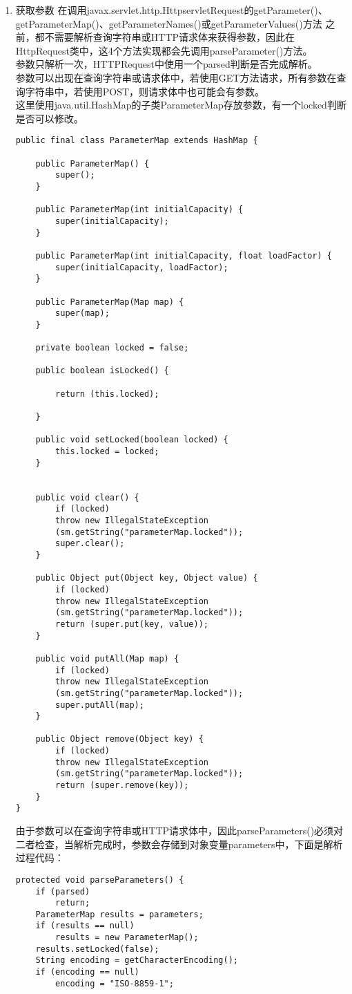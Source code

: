 \begin{enumerate}
\begin{lstlisting}
	return ((Cookie[]) cookies.toArray(new Cookie[cookies.size()]));
	
}
\end{lstlisting}
\item 获取参数
在调用javax.servlet.http.HttpservletRequest的getParameter()、
getParameterMap()、getParameterNames()或getParameterValues()方法
之前，都不需要解析查询字符串或HTTP请求体来获得参数，因此在HttpRequest类中，这4个方法实现都会先调用parseParameter()方法。\\
参数只解析一次，HTTPRequest中使用一个parsed判断是否完成解析。\\
参数可以出现在查询字符串或请求体中，若使用GET方法请求，所有参数在查询字符串中，若使用POST，则请求体中也可能会有参数。\\
这里使用java.util.HashMap的子类ParameterMap存放参数，有一个locked判断是否可以修改。
\begin{lstlisting}
public final class ParameterMap extends HashMap {
	
	public ParameterMap() {
		super();
	}
	
	public ParameterMap(int initialCapacity) {
		super(initialCapacity);
	}

	public ParameterMap(int initialCapacity, float loadFactor) {
		super(initialCapacity, loadFactor);
	}
	
	public ParameterMap(Map map) {
		super(map);
	}
	
	private boolean locked = false;

	public boolean isLocked() {
		
		return (this.locked);
		
	}

	public void setLocked(boolean locked) {	
		this.locked = locked;
	}


	public void clear() {
		if (locked)
		throw new IllegalStateException
		(sm.getString("parameterMap.locked"));
		super.clear();
	}

	public Object put(Object key, Object value) {
		if (locked)
		throw new IllegalStateException
		(sm.getString("parameterMap.locked"));
		return (super.put(key, value));
	}

	public void putAll(Map map) {
		if (locked)
		throw new IllegalStateException
		(sm.getString("parameterMap.locked"));
		super.putAll(map);
	}

	public Object remove(Object key) {
		if (locked)
		throw new IllegalStateException
		(sm.getString("parameterMap.locked"));
		return (super.remove(key));
	}
}
\end{lstlisting}
由于参数可以在查询字符串或HTTP请求体中，因此parseParameters()必须对二者检查，当解析完成时，参数会存储到对象变量parameters中，下面是解析过程代码：
\begin{lstlisting}
protected void parseParameters() {
	if (parsed)
		return;
	ParameterMap results = parameters;
	if (results == null)
		results = new ParameterMap();
	results.setLocked(false);
	String encoding = getCharacterEncoding();
	if (encoding == null)
		encoding = "ISO-8859-1";
	

\end{lstlisting}
\end{enumerate}

